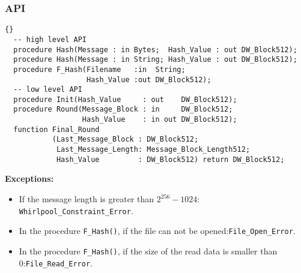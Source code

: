 \subsubsection*{API}
\begin{lstlisting}{}
  -- high level API
  procedure Hash(Message : in Bytes;  Hash_Value : out DW_Block512);
  procedure Hash(Message : in String; Hash_Value : out DW_Block512);
  procedure F_Hash(Filename   :in  String;
                   Hash_Value :out DW_Block512);
  -- low level API
  procedure Init(Hash_Value     : out    DW_Block512);
  procedure Round(Message_Block : in     DW_Block512;
                  Hash_Value    : in out DW_Block512);
  function Final_Round
           (Last_Message_Block : DW_Block512;
            Last_Message_Length: Message_Block_Length512;
            Hash_Value         : DW_Block512) return DW_Block512;
\end{lstlisting}
\textbf{Exceptions:}
\begin{itemize}
\item If the message length is greater than $2^{256}-1024$:\quad
  \texttt{Whirlpool\_Constraint\_Error}.
\item In the procedure \texttt{F\_Hash()}, if the file can not be
  opened:\quad\texttt{File\_Open\_Error}.
\item In the procedure \texttt{F\_Hash()}, if the size of the read
  data is smaller than 0:\quad\texttt{File\_Read\_Error}.
\end{itemize}
